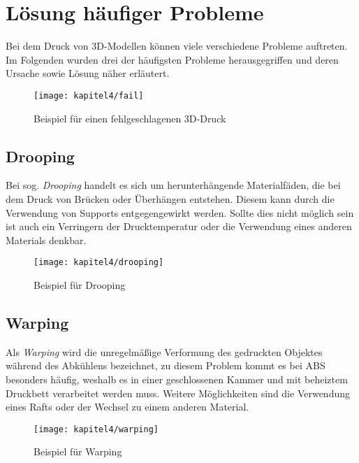 \chapter{Lösung häufiger Probleme}
Bei dem Druck von 3D-Modellen können viele verschiedene Probleme auftreten. Im Folgenden wurden drei der häufigsten Probleme herausgegriffen und deren Ursache sowie Lösung näher erläutert.

\begin{figure}[h]
  \centering
  \texttt{[image: kapitel4/fail]}
  \caption{Beispiel für einen fehlgeschlagenen 3D-Druck}
  \label{Kap4:PrintFail}
\end{figure}

\section{Drooping}
Bei sog. \textit{Drooping} handelt es sich um herunterhängende Materialfäden, die bei dem Druck von Brücken oder Überhängen entstehen. Diesem kann durch die Verwendung von Supports entgegengewirkt werden. Sollte dies nicht möglich sein ist auch ein Verringern der Drucktemperatur oder die Verwendung eines anderen Materials denkbar.

\begin{figure}[h]
  \centering
  \texttt{[image: kapitel4/drooping]}
  \caption{Beispiel für Drooping}
  \label{Kap4:Drooping}
\end{figure}

\clearpage

\section{Warping}
Als \textit{Warping} wird die unregelmäßige Verformung des gedruckten Objektes während des Abkühlens bezeichnet, zu diesem Problem kommt es bei \ac{ABS} besonders häufig, weshalb es in einer geschlossenen Kammer und mit beheiztem Druckbett verarbeitet werden muss. Weitere Möglichkeiten sind die Verwendung eines Rafts oder der Wechsel zu einem anderen Material.

\begin{figure}[h]
  \centering
  \texttt{[image: kapitel4/warping]}
  \caption{Beispiel für Warping}
  \label{Kap4:Warping}
\end{figure}

